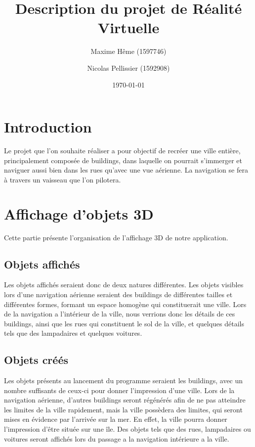 \documentclass[a4paper,12pt]{article}
\title{Description du projet de Réalité Virtuelle}
\date{\today}
\author{Maxime Hême (1597746)  \and Nicolas Pellissier (1592908)}
\begin{document}
\maketitle
\section*{Introduction}
Le projet que l'on souhaite réaliser a pour objectif de recréer une ville entière, principalement composée de buildings, dans laquelle on pourrait s'immerger et naviguer aussi bien dans les rues qu'avec une vue aérienne. La navigation se fera à travers un vaisseau que l'on pilotera.

\section {Affichage d'objets 3D}

Cette partie présente l'organisation de l'affichage 3D de notre application.
\subsection{Objets affichés}
Les objets affichés seraient donc de deux natures différentes. Les objets visibles lors d'une navigation aérienne seraient des buildings de différentes tailles et différentes formes, formant un espace homogène qui constituerait une ville.
Lors de la navigation a l'intérieur de la ville, nous verrions donc les détails de ces buildings, ainsi que les rues qui constituent le sol de la ville, et quelques détails tels que des lampadaires et quelques voitures. 

\subsection{Objets créés}
Les objets présents au lancement du programme seraient les buildings, avec un nombre suffisants de ceux-ci pour donner l'impression d'une ville. 
Lors de la navigation aérienne, d'autres buildings seront régénérés afin de ne pas atteindre les limites de la ville rapidement, mais la ville possèdera des limites, qui seront mises en évidence par l'arrivée sur la mer. En effet, la ville pourra donner l'impression d'être située sur une île.
Des objets tels que des rues, lampadaires ou voitures seront affichés lors du passage a la navigation intérieure a la ville.
\end{document}
